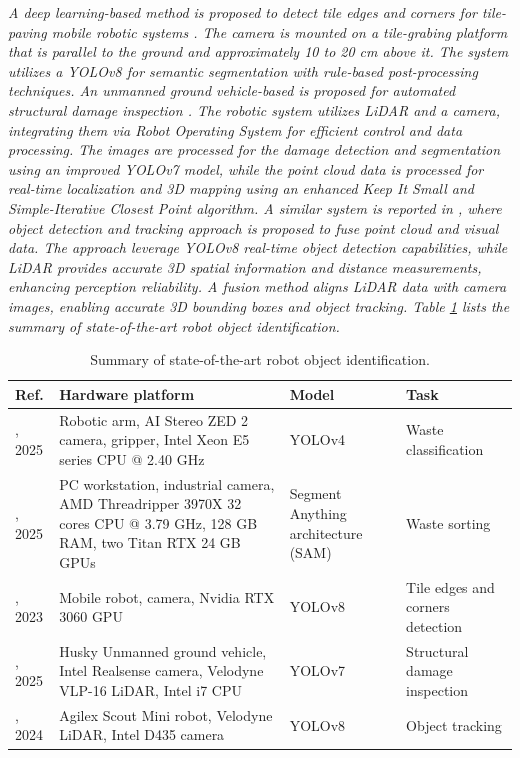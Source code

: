 \documentclass[preprint,12pt]{elsarticle}
\begin{document}
\emph{A deep learning-based method is proposed to detect tile edges and corners for tile-paving mobile robotic systems \citep{liu_automatic_2025}. The camera is mounted on a tile-grabing platform that is parallel to the ground and approximately 10 to 20 cm above it. The system utilizes a YOLOv8 for semantic segmentation with rule-based post-processing techniques. An unmanned ground vehicle-based is proposed for automated structural damage inspection \citep{ge_deep_2025}. The robotic system utilizes LiDAR and a camera, integrating them via Robot Operating System for efficient control and data processing. The images are processed for the damage detection and segmentation using an improved YOLOv7 model, while the point cloud data is processed for real-time localization and 3D mapping using an enhanced Keep It Small and Simple-Iterative Closest Point algorithm. A similar system is reported in \citep{dai_advanced_2024}, where object detection and tracking approach is proposed to fuse point cloud and visual data. The approach leverage YOLOv8 real-time object detection capabilities, while LiDAR provides accurate 3D spatial information and distance measurements, enhancing perception reliability. A fusion method aligns LiDAR data with camera images, enabling accurate 3D bounding boxes and object tracking. Table \ref{table_summary_objidn_studies} lists the summary of state-of-the-art robot object identification.}

\begin{center}
\begin{table}
\caption{Summary of state-of-the-art robot object identification.}
\scriptsize
\begin{tabular}{|p{1cm} | p{4.5cm} | p{4.5cm} | p{3.0cm} |}
 \hline
 Ref. & Hardware platform & Model & Task \\ 
 \hline
 \citep{le_application_2025}, 2025 & Robotic arm, AI Stereo ZED 2 camera, gripper, Intel Xeon E5 series CPU @ 2.40 GHz & YOLOv4 & Waste classification \\ 
 \hline
 \citep{vukicevic_versatile_2025}, 2025 & PC workstation, industrial camera, AMD Threadripper 3970X 32 cores CPU @ 3.79 GHz, 128 GB RAM, two Titan RTX 24 GB GPUs & Segment Anything architecture (SAM) & Waste sorting \\
 \hline
\citep{kirillov_segment_2023}, 2023 & Mobile robot, camera, Nvidia RTX 3060 GPU & YOLOv8 & Tile edges and corners detection \\
 \hline
 \citep{ge_deep_2025}, 2025 & Husky Unmanned ground vehicle, Intel Realsense camera, Velodyne VLP-16 LiDAR, Intel i7 CPU & YOLOv7 & Structural damage inspection \\
 \hline
 \citep{dai_advanced_2024}, 2024 & Agilex Scout Mini robot, Velodyne LiDAR, Intel D435 camera & YOLOv8 & Object tracking \\ 
 \hline
\end{tabular}
\label{table_summary_objidn_studies}
\end{table}
\end{center}
\end{document}
